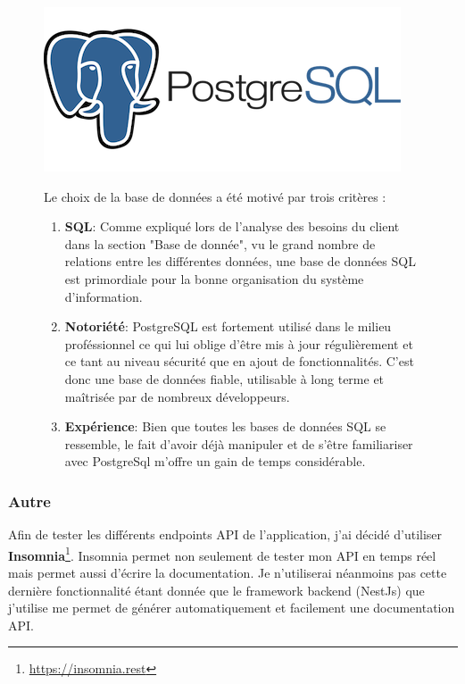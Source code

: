 \begin{figure}[H]
  \begin{minipage}{.3\textwidth}
    \includegraphics[width=0.75\linewidth]{img/tech/PostgreSql.png} 
  \end{minipage} 
  \begin{minipage}{.7\textwidth}
    Le choix de la base de données a été motivé par trois critères :
    \begin{enumerate}
      \item \textbf{SQL}: Comme expliqué lors de l'analyse des besoins du client dans la section "Base de donnée", vu le grand nombre de relations entre les différentes données, une base de données SQL est primordiale pour la bonne organisation du système d'information.
      \item \textbf{Notoriété}: PostgreSQL est fortement utilisé dans le milieu proféssionnel ce qui lui oblige d'être mis à jour régulièrement et ce tant au niveau sécurité que en ajout de fonctionnalités. C'est donc une base de données fiable, utilisable à long terme et maîtrisée par de nombreux développeurs.
      \item \textbf{Expérience}: Bien que toutes les bases de données SQL se ressemble, le fait d'avoir déjà manipuler et de s'être familiariser avec PostgreSql m'offre un gain de temps considérable.
    \end{enumerate}
  \end{minipage} 
\end{figure}

\subsubsection{Autre}


Afin de tester les différents endpoints API de l'application, j'ai décidé d'utiliser \textbf{Insomnia}\footnote{\url{https://insomnia.rest}}. Insomnia permet non seulement de tester mon API en temps réel mais permet aussi d'écrire la documentation. Je n'utiliserai néanmoins pas cette dernière fonctionnalité étant donnée que le framework backend (NestJs) que j'utilise me permet de générer automatiquement et facilement une documentation API.

